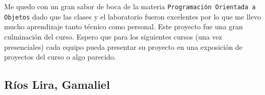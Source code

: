 Me quedo con un gran sabor de boca de la materia \texttt{Programación Orientada a Objetos} dado que las clases
y el laboratorio fueron excelentes por lo que me llevo mucho aprendizaje tanto técnico como personal. Este proyecto
fue una gran culminación del curso. Espero que para los siguientes cursos (una vez presenciales) cada equipo
pueda presentar su proyecto en una exposición de proyectos del curso o algo parecido.

\subsection*{Ríos Lira, Gamaliel}
